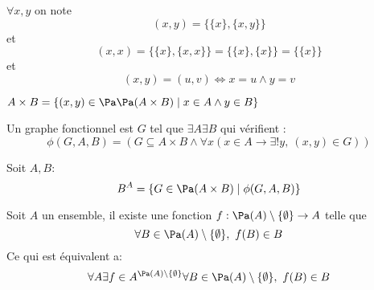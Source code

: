 \begin{definition}
	$\forall x,y $ on note
	$$ (x,y) = \{\{ x\}, \{x,y\} \} $$
	et
	$$ (x,x) = \{\{ x\}, \{x,x\} \} = \{\{ x\}, \{x\} \} = \{\{ x\}\}$$
	et
	$$ (x,y) = (u,v) \iff x = u \wedge y = v $$
\end{definition}

\begin{definition}
	$A \times B = \left\{ (x,y) \in \Pa \Pa (A\times B) \mid x \in A \wedge y \in B \right\}$
\end{definition}


\begin{definition}
	Un graphe fonctionnel est $G$ tel que $ \exists A \exists B $ qui vérifient :
	$$\phi (G,A,B) = \left( G \subseteq A \times B \wedge \forall x \left( x \in A \to \exists ! y, \  (x,y) \in G\right)\right) $$
\end{definition}

\begin{definition}
	Soit $A,B$:
	$$ B^A = \left\{G \in \Pa (A\times B)\mid \phi (G,A,B)\right\} $$
\end{definition}


\begin{axiom}[Choix]
	Soit $A$ un ensemble, il existe une fonction $f : \Pa(A)\setminus \{\emptyset\} \to A$ telle que
	$$ \forall B \in \Pa(A)\setminus\{\emptyset\}, \ f(B) \in B$$
	Ce qui est équivalent a:
	$$ \forall A \exists f \in A^{\Pa(A)\setminus\{\emptyset\}} \forall B \in \Pa(A)\setminus\{\emptyset\}, \ f(B) \in B$$

\end{axiom}







